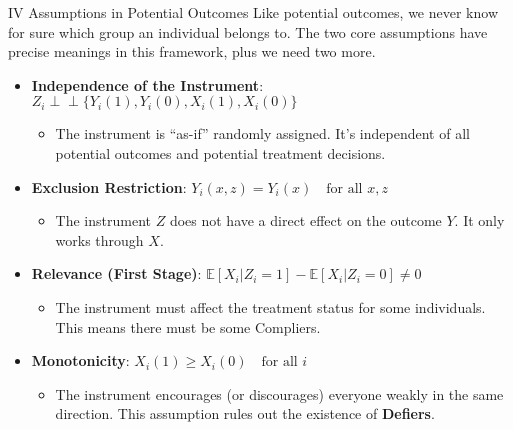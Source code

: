 \documentclass[
  ignorenonframetext,
  aspectratio=169]{beamer}
\providecommand{\tightlist}{%
  \setlength{\itemsep}{0pt}\setlength{\parskip}{0pt}}
\newcommand{\E}{\mathbb{E}}
\newcommand{\indep}{\perp \!\!\! \perp}
\begin{document}
\begin{frame}{IV Assumptions in Potential Outcomes}
\label{iv-assumptions-in-potential-outcomes}
Like potential outcomes, we never know for sure which group an
individual belongs to. The two core assumptions have precise meanings in
this framework, plus we need two more.

\begin{itemize}
\tightlist
\item
  \textbf{Independence of the Instrument}:
  \(Z_i \indep \{ Y_i(1), Y_i(0), X_i(1), X_i(0) \}\)

  \begin{itemize}
  \tightlist
  \item
    The instrument is ``as-if'' randomly assigned. It's independent of
    all potential outcomes and potential treatment decisions.
  \end{itemize}
\item
  \textbf{Exclusion Restriction}:
  \(Y_i(x, z) = Y_i(x) \quad \text{for all } x, z\)

  \begin{itemize}
  \tightlist
  \item
    The instrument \(Z\) does not have a direct effect on the outcome
    \(Y\). It only works through \(X\).
  \end{itemize}
\item
  \textbf{Relevance (First Stage)}:
  \(\E[X_i | Z_i=1] - \E[X_i | Z_i=0] \neq 0\)

  \begin{itemize}
  \tightlist
  \item
    The instrument must affect the treatment status for some
    individuals. This means there must be some Compliers.
  \end{itemize}
\item
  \textbf{Monotonicity}: \(X_i(1) \geq X_i(0) \quad \text{for all } i\)

  \begin{itemize}
  \tightlist
  \item
    The instrument encourages (or discourages) everyone weakly in the
    same direction. This assumption rules out the existence of
    \textbf{Defiers}.
  \end{itemize}
\end{itemize}
\end{frame}
\end{document}
